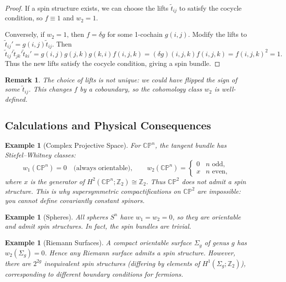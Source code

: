\documentclass[11pt]{article}
\newcommand{\Z}{\mathbb{Z}}
\newcommand{\CP}{\mathbb{CP}}
\newtheorem{example}[theorem]{Example}
\newtheorem{remark}[theorem]{Remark}
\begin{document}
\begin{proof}
If a spin structure exists, we can choose the lifts \(\tilde{t}_{ij}\) to satisfy the cocycle condition, so \(f \equiv 1\) and \(w_2 = 1\).

Conversely, if \(w_2 = 1\), then \(f = \delta g\) for some 1-cochain \(g(i,j)\). Modify the lifts to \(\tilde{t}_{ij}' = g(i,j)\tilde{t}_{ij}\). Then
\[
\tilde{t}_{ij}'\tilde{t}_{jk}'\tilde{t}_{ki}' = g(i,j)g(j,k)g(k,i) f(i,j,k) = (\delta g)(i,j,k) f(i,j,k) = f(i,j,k)^2 = 1.
\]
Thus the new lifts satisfy the cocycle condition, giving a spin bundle.
\end{proof}

\begin{remark}
The choice of lifts is not unique: we could have flipped the sign of some \(\tilde{t}_{ij}\). This changes \(f\) by a coboundary, so the cohomology class \(w_2\) is well-defined.
\end{remark}

\subsection{Calculations and Physical Consequences}
\begin{example}[Complex Projective Space]
For \(\CP^n\), the tangent bundle has Stiefel--Whitney classes:
\[
w_1(\CP^n) = 0 \quad \text{(always orientable)}, \qquad
w_2(\CP^n) = \begin{cases}
0 & n \text{ odd},\\
x & n \text{ even},
\end{cases}
\]
where \(x\) is the generator of \(H^2(\CP^n;\Z_2) \cong \Z_2\). Thus \(\CP^2\) does \emph{not} admit a spin structure. This is why supersymmetric compactifications on \(\CP^2\) are impossible: you cannot define covariantly constant spinors.
\end{example}

\begin{example}[Spheres]
All spheres \(S^n\) have \(w_1 = w_2 = 0\), so they are orientable and admit spin structures. In fact, the spin bundles are trivial.
\end{example}

\begin{example}[Riemann Surfaces]
A compact orientable surface \(\Sigma_g\) of genus \(g\) has \(w_2(\Sigma_g) = 0\). Hence any Riemann surface admits a spin structure. However, there are \(2^{2g}\) inequivalent spin structures (differing by elements of \(H^1(\Sigma_g;\Z_2)\)), corresponding to different boundary conditions for fermions.
\end{example}
\end{document}
